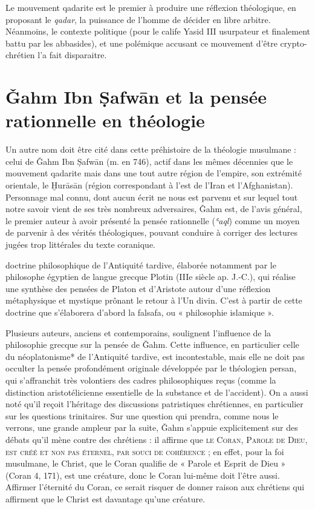 \begin{Synthesis}
Le mouvement qadarite est le premier à produire une réflexion théologique, en proposant le \emph{qadar}, la puissance de l'homme de décider en libre arbitre. Néanmoins, le contexte politique (pour le calife Yasid III usurpateur et finalement battu par les abbasides), et une polémique accusant ce mouvement d'être crypto-chrétien l'a fait disparaitre.
\end{Synthesis}
 
\section{Ǧahm Ibn Ṣafwān et la pensée rationnelle en
théologie} 
\label{Theol:JahmIbnSafwan}

Un autre nom doit être cité dans cette préhistoire de la théologie
musulmane : celui de Ǧahm Ibn Ṣafwān (m. en 746), actif dans les mêmes
décennies que le mouvement qadarite mais dans une tout autre région de
l'empire, son extrémité orientale, le Ḫurāsān (région correspondant à
l'est de l'Iran et l'Afghanistan). Personnage mal connu, dont aucun
écrit ne nous est parvenu et sur lequel tout notre savoir vient de ses
très nombreux adversaires, Ǧahm est, de l'avis général, le premier
auteur à avoir présenté la pensée rationnelle (\emph{ʿaql}) comme un
moyen de parvenir à des vérités théologiques, pouvant conduire à
corriger des lectures jugées trop littérales du texte coranique.

\begin{Def}[Neoplatonisme]
doctrine philosophique de l’Antiquité tardive, élaborée notamment
par le philosophe égyptien de langue grecque Plotin (IIIe
siècle ap. J.-C.), qui réalise une
synthèse des pensées de Platon et d’Aristote autour d’une réflexion métaphysique et
mystique prônant le retour à l’Un divin. C’est à partir de cette doctrine que s’élaborera
d’abord la falsafa, ou « philosophie islamique ».
\end{Def}
Plusieurs auteurs, anciens et contemporains, soulignent l'influence de
la philosophie grecque sur la pensée de Ǧahm. Cette influence, en
particulier celle du néoplatonisme* de l'Antiquité tardive, est
incontestable, mais elle ne doit pas occulter la pensée profondément
originale développée par le théologien persan, qui s'affranchit très
volontiers des cadres philosophiques reçus (comme la distinction
aristotélicienne essentielle de la substance et de l'accident). On a
aussi noté qu'il reçoit l'héritage des discussions patristiques
chrétiennes, en particulier sur les questions trinitaires. Sur une
question qui prendra, comme nous le verrons, une grande ampleur par la
suite, Ǧahm s'appuie explicitement sur des débats qu'il mène
contre des chrétiens : il affirme que \textsc{le Coran, Parole de Dieu, est créé
et non pas éternel, par souci de cohérence }; en effet, pour la foi
musulmane, le Christ, que le Coran qualifie de
« Parole et Esprit de Dieu » (Coran 4, 171), est une créature, donc le
Coran lui-même doit l'être aussi. Affirmer l'éternité du Coran, ce
serait risquer de donner raison aux chrétiens qui affirment que le
Christ est davantage qu'une créature.

